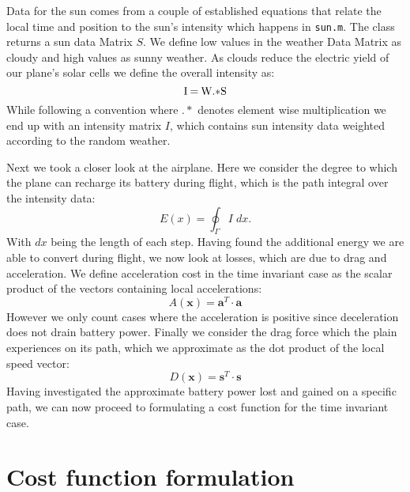 \documentclass[ twoside,openright,titlepage,numbers=noenddot,headinclude,%
                footinclude=true,cleardoublepage=empty,abstractoff, %
                BCOR=5mm,paper=a4,fontsize=11pt,%
                ngerman,american,%
                ]{scrreprt}
\begin{document}
Data for the sun comes from a couple of established equations that relate the local time and position to the sun's intensity  which happens in \texttt{sun.m}. The class returns a sun data Matrix $S$. We define low values in the weather Data Matrix as cloudy and high values as sunny weather. As clouds reduce the electric yield of our plane's solar cells we define the overall intensity as:
\begin{equation}
$I$ \:= \: $W$ .* $S$
\end{equation}
While following a convention where $.*$ denotes element wise multiplication we end up with an intensity matrix $I$, which contains sun intensity data weighted according to the random weather.

Next we took a closer look at the airplane. Here we consider the degree to which the plane can recharge its battery during flight, which is the path integral over the intensity data:
\begin{equation} \label{eqn:sunNotime}
E(x) = \oint_{\Gamma} I  \; dx.
\end{equation}
With $dx$ being the length of each step. Having found the additional energy we are able to convert during flight, we now look at losses, which are due to drag and acceleration. We define acceleration cost in the time invariant case as the scalar product of the vectors containing local accelerations:
\begin{equation}
A(\mathbf{x}) = \mathbf{a}^T \cdot \mathbf{a}
\end{equation}
 However we only count cases where the acceleration is positive since deceleration does not drain battery power.
Finally we consider the drag force which the plain experiences on its path, which we approximate as the dot product of the local speed vector:
\begin{equation}
D(\mathbf{x}) = \mathbf{s}^T \cdot \mathbf{s}
\end{equation}
Having investigated the approximate battery power lost and gained on a specific path, we can now proceed to formulating a cost function for the time invariant case.

\section{Cost function formulation}
\end{document}
